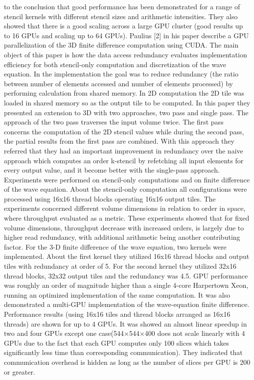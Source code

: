 to the conclusion that good performance has been demonstrated for a range of stencil kernels with different stencil sizes and arithmetic intensities. They also showed that there is a good scaling across a large GPU cluster (good results up to 16 GPUs and scaling up to 64 GPUs).
Paulius [2] in his paper describe a GPU parallelization of the 3D finite difference computation using CUDA. The main object of this paper is how the data access redundancy evaluates implementation efficiency for both stencil-only computation and discretization of the wave equation. In the implementation the goal was to reduce redundancy (the ratio between number of elements accessed and number of elements processed) by performing calculation from shared memory. In 2D computation the 2D tile was loaded in shared memory so as the output tile to be computed. In this paper they presented an extension to 3D with two approaches, two pass and single pass. The approach of the two pass traverses the input volume twice. The first pass concerns the computation of the 2D stencil values while during the second pass, the partial results from the first pass are combined. With this approach they referred that they had an important improvement in redundancy over the naive approach which computes an order k-stencil by refetching all input elements for every output value, and it become better with the single-pass approach. Experiments were performed on stencil-only computations and on finite difference of the wave equation. About the stencil-only computation all configurations were processed using 16x16 thread blocks operating 16x16 output tiles. The experiments concerned different volume dimensions in relation to order in space, where throughput evaluated as a metric. These experiments showed that for fixed volume dimensions, throughput decrease with increased orders, is largely due to higher read redundancy, with additional arithmetic being another contributing factor. For the 3-D finite difference of the wave equation, two kernels were implemented. About the first kernel they utilized 16x16 thread blocks and output tiles with redundancy at order of 5. For the second kernel they utilized 32x16 thread blocks, 32x32 output tiles and the redundancy was 4.5. GPU performance was roughly an order of magnitude higher than a single 4-core Harpertown Xeon, running an optimized implementation of the same computation. It was also demonstrated a multi-GPU implementation of the wave-equation finite difference. Performance results (using 16x16 tiles and thread blocks arranged as 16x16 threads) are shown for up to 4 GPUs. It was showed an almost linear speedup in two and four GPUs except one case(544×544×400 does not scale linearly with 4 GPUs due to the fact that each GPU computes only 100 slices which takes significantly less time than corresponding communication). They indicated that communication overhead is hidden as long as the number of slices per GPU is 200 or greater.
